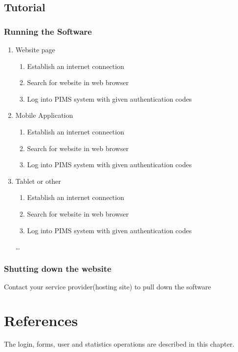 \documentclass[a4paper]{article}
\begin{document}
\subsection{Tutorial}
\subsubsection{Running the Software}
\begin{enumerate}
  \item Website page
  \begin{enumerate}
  \item Establish an internet connection
    \item Search for website in web browser
    \item Log into PIMS system with given authentication codes
  \end{enumerate}
  \item Mobile Application
   \begin{enumerate}
   \item Establish an internet connection
    \item Search for website in web browser
    \item Log into PIMS system with given authentication codes
  \end{enumerate}
  \item Tablet or other
   \begin{enumerate}
\item Establish an internet connection  
    \item Search for website in web browser
    \item Log into PIMS system with given authentication codes
  \end{enumerate} \ldots
\end{enumerate}

\subsubsection{Shutting down the website}
Contact your service provider(hosting site) to pull down the software


\section{References}
\begin{description}
\item The login, forms, user and statistics operations are described in this chapter.
\end{description}
\end{document}
